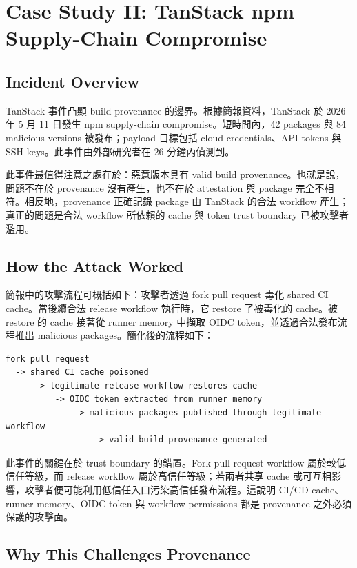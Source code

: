 \documentclass[12pt,a4paper]{article}
\begin{document}
\section{Case Study II: TanStack npm Supply-Chain Compromise}

\subsection{Incident Overview}

TanStack 事件凸顯 build provenance 的邊界。根據簡報資料，TanStack 於 2026 年 5 月 11 日發生 npm supply-chain compromise。短時間內，42 packages 與 84 malicious versions 被發布；payload 目標包括 cloud credentials、API tokens 與 SSH keys。此事件由外部研究者在 26 分鐘內偵測到。

此事件最值得注意之處在於：惡意版本具有 valid build provenance。也就是說，問題不在於 provenance 沒有產生，也不在於 attestation 與 package 完全不相符。相反地，provenance 正確記錄 package 由 TanStack 的合法 workflow 產生；真正的問題是合法 workflow 所依賴的 cache 與 token trust boundary 已被攻擊者濫用。

\subsection{How the Attack Worked}

簡報中的攻擊流程可概括如下：攻擊者透過 fork pull request 毒化 shared CI cache。當後續合法 release workflow 執行時，它 restore 了被毒化的 cache。被 restore 的 cache 接著從 runner memory 中擷取 OIDC token，並透過合法發布流程推出 malicious packages。簡化後的流程如下：

\begin{lstlisting}[style=commandstyle]
fork pull request
  -> shared CI cache poisoned
      -> legitimate release workflow restores cache
          -> OIDC token extracted from runner memory
              -> malicious packages published through legitimate workflow
                  -> valid build provenance generated
\end{lstlisting}

此事件的關鍵在於 trust boundary 的錯置。Fork pull request workflow 屬於較低信任等級，而 release workflow 屬於高信任等級；若兩者共享 cache 或可互相影響，攻擊者便可能利用低信任入口污染高信任發布流程。這說明 CI/CD cache、runner memory、OIDC token 與 workflow permissions 都是 provenance 之外必須保護的攻擊面。

\subsection{Why This Challenges Provenance}
\end{document}

